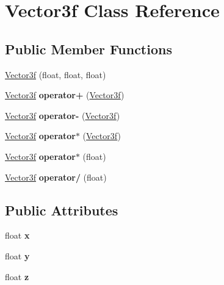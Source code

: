 \hypertarget{class_vector3f}{}\section{Vector3f Class Reference}
\label{class_vector3f}
\subsection*{Public Member Functions}
\begin{DoxyCompactItemize}
\item 
\mbox{\hyperlink{class_vector3f_aac9805649d4f118145b06f54afc57474}{Vector3f}} (float, float, float)
\item 
\mbox{\label{class_vector3f_aef5b1d759caaf17428d570f1776983fe}} 
\mbox{\hyperlink{class_vector3f}{Vector3f}} {\bfseries operator+} (\mbox{\hyperlink{class_vector3f}{Vector3f}})
\item 
\mbox{\label{class_vector3f_aea53e8855c0c1472fd6377ed4600c1a7}} 
\mbox{\hyperlink{class_vector3f}{Vector3f}} {\bfseries operator-\/} (\mbox{\hyperlink{class_vector3f}{Vector3f}})
\item 
\mbox{\label{class_vector3f_a8298246599dc5c89fcb373a7fda7db18}} 
\mbox{\hyperlink{class_vector3f}{Vector3f}} {\bfseries operator$\ast$} (\mbox{\hyperlink{class_vector3f}{Vector3f}})
\item 
\mbox{\label{class_vector3f_a094ee368da0cf9936aafb9d2cae84568}} 
\mbox{\hyperlink{class_vector3f}{Vector3f}} {\bfseries operator$\ast$} (float)
\item 
\mbox{\label{class_vector3f_a6ad5373f903e516afe64435d4186722f}} 
\mbox{\hyperlink{class_vector3f}{Vector3f}} {\bfseries operator/} (float)
\end{DoxyCompactItemize}
\subsection*{Public Attributes}
\begin{DoxyCompactItemize}
\item 
\mbox{\label{class_vector3f_a4aca0751716b7099b397e8c63b16bfcf}} 
float {\bfseries x}
\item 
\mbox{\label{class_vector3f_a8a602e2ee75126feb520c2aa27e7eff5}} 
float {\bfseries y}
\item 
\mbox{\label{class_vector3f_a470cff51eb6463672be518f5af4e26db}} 
float {\bfseries z}
\end{DoxyCompactItemize}


